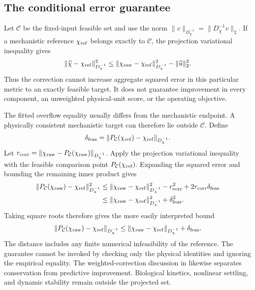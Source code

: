\subsection{The conditional error guarantee}

Let $\mathcal C$ be the fixed-input feasible set and use the norm
$\|v\|_{D_\chi^{-1}}=\|D_\chi^{-1}v\|_2$. If a mechanistic reference $\chi_{\rm ref}$ belongs exactly to $\mathcal C$, the projection variational inequality gives
\begin{equation}
\|\widehat\chi-\chi_{\rm ref}\|_{D_\chi^{-1}}^2
\le\|\chi_{\rm raw}-\chi_{\rm ref}\|_{D_\chi^{-1}}^2
-\|\widehat u\|_2^2.
\label{eq:plant_projection_error_exact}
\end{equation}
Thus the correction cannot increase aggregate squared error in this particular metric to an exactly feasible target. It does not guarantee improvement in every component, an unweighted physical-unit score, or the operating objective.

The fitted overflow equality usually differs from the mechanistic endpoint. A physically consistent mechanistic target can therefore lie outside $\mathcal C$. Define
\begin{equation}
\delta_{\rm feas}=\|P_{\mathcal C}(\chi_{\rm ref})-\chi_{\rm ref}\|_{D_\chi^{-1}}.
\end{equation}
Let $r_{\rm corr}=\|\chi_{\rm raw}-P_{\mathcal C}(\chi_{\rm raw})\|_{D_\chi^{-1}}$. Apply the projection variational inequality with the feasible comparison point $P_{\mathcal C}(\chi_{\rm ref})$. Expanding the squared error and bounding the remaining inner product gives
\begin{align}
\|P_{\mathcal C}(\chi_{\rm raw})-\chi_{\rm ref}\|_{D_\chi^{-1}}^2
&\le\|\chi_{\rm raw}-\chi_{\rm ref}\|_{D_\chi^{-1}}^2
-r_{\rm corr}^2+2r_{\rm corr}\delta_{\rm feas}\\
&\le\|\chi_{\rm raw}-\chi_{\rm ref}\|_{D_\chi^{-1}}^2+\delta_{\rm feas}^2.
\end{align}
Taking square roots therefore gives the more easily interpreted bound
\begin{equation}
\|P_{\mathcal C}(\chi_{\rm raw})-\chi_{\rm ref}\|_{D_\chi^{-1}}
\le\|\chi_{\rm raw}-\chi_{\rm ref}\|_{D_\chi^{-1}}+\delta_{\rm feas}.
\label{eq:plant_projection_error_general}
\end{equation}
The distance includes any finite numerical infeasibility of the reference. The guarantee cannot be invoked by checking only the physical identities and ignoring the empirical equality. The weighted-correction discussion in \citet{SturmSilva2024} likewise separates conservation from predictive improvement. Biological kinetics, nonlinear settling, and dynamic stability remain outside the projected set.

